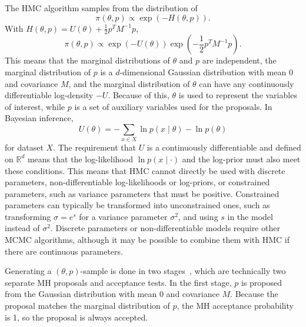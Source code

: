 \documentclass[english,twoside,openright]{HYgraduMLDS}
\newcommand{\R}{\mathbb{R}}
\begin{document}
The HMC algorithm samples from the distribution of~\cite{neal2012mcmc}
\[
    \pi(\theta, p) \propto \exp(-H(\theta, p)).
\]
With \(H(\theta, p) = U(\theta) + \frac{1}{2}p^{T}M^{-1}p\),
\[
    \pi(\theta, p) \propto \exp(-U(\theta))\exp\left(-\frac{1}{2}p^{T}M^{-1}p\right).
\]
This means that the marginal distributions of \(\theta\) and \(p\) are 
independent, the marginal distribution of \(p\) is a \(d\)-dimensional
Gaussian distribution 
with mean 0 and covariance \(M\), and the marginal distribution of
\(\theta\) can have any continuously differentiable log-density \(-U\).
Because of this, \(\theta\) is used to represent the variables of interest,
while \(p\) is a set of auxiliary variables used for the proposals.
In Bayesian inference,
\[
  U(\theta) = -\sum_{x\in X}\ln p(x\mid \theta) - \ln p(\theta)
\]
for dataset \(X\). The requirement that \(U\) is a continuously differentiable
and defined on \(\R^{d}\) means that the log-likelihood \(\ln p(x\mid \cdot)\)
and the log-prior must also meet these conditions. This means that HMC cannot directly
be used with discrete parameters, non-differentiable log-likelihoods or log-priors,
or constrained parameters, such as variance
parameters that must be positive. Constrained parameters can typically be
transformed into unconstrained ones, such as transforming \(\sigma = e^{s}\)
for a variance parameter \(\sigma^{2}\), and using \(s\) in the model instead
of \(\sigma^{2}\). Discrete parameters or non-differentiable models
require other MCMC algorithms, although it may be possible to combine them
with HMC if there are continuous parameters.

Generating a \((\theta, p)\)-sample is done in two stages~\cite{neal2012mcmc}, 
which are technically 
two separate MH proposals and acceptance tests. In the first
stage, \(p\) is proposed from the Gaussian distribution with mean 0 and 
covariance \(M\). Because the proposal matches the marginal distribution of 
\(p\), the MH acceptance probability is 1, so the proposal
is always accepted.
\end{document}
